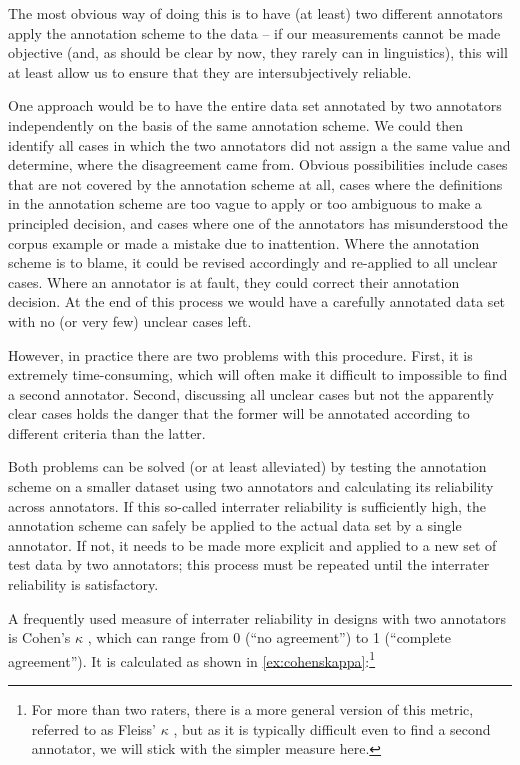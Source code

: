 The most obvious way of doing this is to have (at least) two different annotators apply the annotation scheme to the data -- if our measurements cannot be made objective (and, as should be clear by now, they rarely can in linguistics), this will at least allow us to ensure that they are intersubjectively reliable.

One approach would be to have the entire data set annotated by two annotators independently on the basis of the same annotation scheme. We could then identify all cases in which the two annotators did not assign a the same value and determine, where the disagreement came from. Obvious possibilities include cases that are not covered by the annotation scheme at all, cases where the definitions in the annotation scheme are too vague to apply or too ambiguous to make a principled decision, and cases where one of the annotators has misunderstood the corpus example or made a mistake due to inattention. Where the annotation scheme is to blame, it could be revised accordingly and re-applied to all unclear cases. Where an annotator is at fault, they could correct their annotation decision. At the end of this process we would have a carefully annotated data set with no (or very few) unclear cases left.

However, in practice there are two problems with this procedure. First, it is extremely time-consuming, which will often make it difficult to impossible to find a second annotator. Second, discussing all unclear cases but not the apparently clear cases holds the danger that the former will be annotated according to different criteria than the latter.

Both problems can be solved (or at least alleviated) by testing the annotation scheme on a smaller dataset using two annotators and calculating its reliability across annotators. If this so-called interrater reliability is sufficiently high, the annotation scheme can safely be applied to the actual data set by a single annotator. If not, it needs to be made more explicit and applied to a new set of test data by two annotators; this process must be repeated until the interrater reliability is satisfactory.

A frequently used measure of interrater reliability in designs with two annotators is Cohen's $\kappa$ \citet{cohen_coefficient_1960}, which can range from 0 (``no agreement'') to 1 (``complete agreement''). It is calculated as shown in \ref{ex:cohenskappa}:\footnote{For more than two raters, there is a more general version of this metric, referred to as Fleiss' $\kappa$ \citet{fleiss_measuring_1971}, but as it is typically difficult even to find a second annotator, we will stick with the simpler measure here.}

